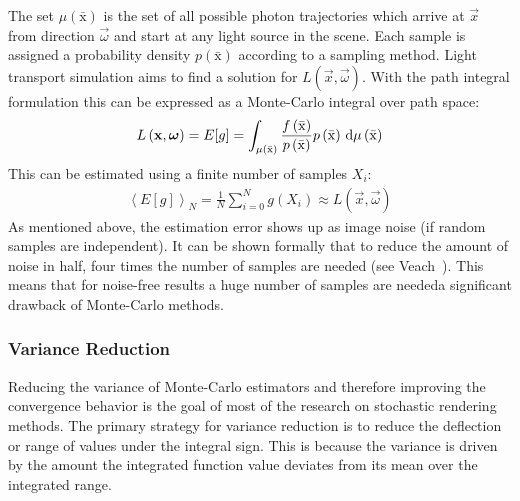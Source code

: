 The set $\mu\left(\bar{\mathrm{x}}\right)$ is the set of all possible photon trajectories which arrive at $\vec{x}$ from direction $\vec{\omega}$ and start at any light source in the scene. Each sample is assigned a probability density $p\left(\bar{\mathrm{x}}\right)$ according to a sampling method. Light transport simulation aims to find a solution for $L(\vec{x}, \vec{\omega})$. With the path integral formulation this can be expressed as a Monte-Carlo integral over path space:
\begin{align}
L\left(\boldsymbol{\mathbf{x}},\boldsymbol{\mathbf{\omega}}\right) = E[g] = \int_{\mu\left(\bar{\mathrm{x}}\right)} \frac{f\left(\bar{\mathrm{x}}\right)}{p\left(\bar{\mathrm{x}}\right)}p\left(\bar{\mathrm{x}}\right)
\,\mathrm{d}\mu\left(\bar{\mathrm{x}}\right)
\end{align}
This can be estimated using a finite number of samples $X_i$:
\begin{align}
\left<E[g]\right>_N = 
\frac{1}{N}\sum_{i=0}^{N}
g\left(X_i\right)
\approx
L\left(\vec{x},\vec{\omega}\right)
\end{align}
As mentioned above, the estimation error shows up as image noise (if random samples are independent). It can be shown formally that to reduce the amount of noise in half, four times the number of samples are needed (see Veach~\cite{VeachThesis97}). This means that for noise-free results a huge number of samples are needed\mydash a significant drawback of Monte-Carlo methods.

\subsubsection*{Variance Reduction}

Reducing the variance of Monte-Carlo estimators and therefore improving the convergence behavior is the goal of most of the research on stochastic rendering methods. The primary strategy for variance reduction is to reduce the deflection or range of values under the integral sign. This is because the variance is driven by the amount the integrated function value deviates from its mean over the integrated range.

